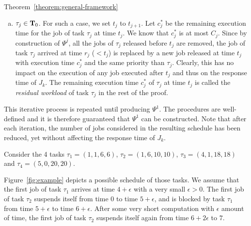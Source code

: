 \begin{appProof}{Theorem~\ref{theorem:general-framework}}
\begin{enumerate}[(a)]
\begin{itemize}
Moreover, because no task with lower priority than $\tau_j$ executes jobs before $t_{j+1}$ in $\Psi^{j+1}$, removing the jobs released by $\tau_j$ before $t_{j+1}$ does not impact the schedule of the jobs of $\tau_{j+1}, \ldots, \tau_{k}$. Therefore, $t_j$ is set to $t_{j+1}$ and $\Psi^j$ is generated by removing all the jobs of task $\tau_j$ arrived before $t_{j+1}$. The response time of $J_{k}$ in $\Psi^j$ thus remains unchanged in comparison to its response time in $\Psi^{j+1}$.  
\end{itemize}
\item $\tau_j \in {\bf T}_0$. For such a case, we set $t_{j}$ to $t_{j+1}$. Let $c_j^*$ be the remaining execution time for the job of task $\tau_j$ at time $t_j$. We know that $c_j^*$ is at most $C_j$. Since by construction of $\Psi^j$, all the jobs of $\tau_j$ released before $t_j$ are removed, the job of task $\tau_j$ arrived at time $r_j$ ($< t_j$) is replaced by a new job released at time $t_j$ with execution time $c_j^*$ and the same priority than $\tau_j$. Clearly, this has no impact on the execution of any job executed after $t_j$ and thus on the response time of $J_k$. The remaining execution time $c_j^*$ of $\tau_j$ at time $t_j$ is called the \emph{residual workload} of task $\tau_j$ in the rest of the proof.
\end{enumerate}
 
This iterative process is repeated until producing $\Psi^1$. The procedures are well-defined and it is therefore guaranteed that $\Psi^1$ can be constructed. Note that after each iteration, the number of jobs considered in the resulting schedule has been reduced, yet without affecting the response time of $J_k$.

 


\begin{example}
Consider the 4 tasks $\tau_1 =(1,1,6,6)$, $\tau_2 =(1,6,10,10)$, $\tau_3 =(4,1,18,18)$ and $\tau_4 =(5,0,20,20)$.

Figure~\ref{fig:example} depicts a possible schedule of those tasks. We assume that the first job of task $\tau_1$ arrives
at time $4+\epsilon$ with a very small $\epsilon > 0$. The first job
of task $\tau_2$ suspends itself from time $0$ to time $5+\epsilon$,
and is blocked by task $\tau_1$ from time $5+\epsilon$ to time
$6+\epsilon$. After some very short computation with $\epsilon$ amount
of time, the first job of task $\tau_2$ suspends itself again from
time $6+2\epsilon$ to $7$. 
   

\end{example}
\end{appProof}
